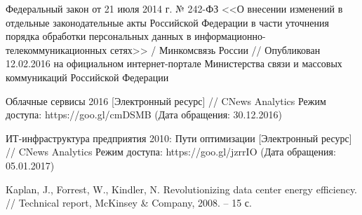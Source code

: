 \begin{thebibliography}{00}
    Федеральный закон от 21 июля 2014 г. № 242-ФЗ <<О внесении изменений в отдельные законодательные акты Российской Федерации в части уточнения порядка обработки персональных данных в информационно-телекоммуникационных сетях>> /
    Минкомсвязь России //
    Опубликован 12.02.2016 на официальном интернет-портале Министерства связи и массовых коммуникаций Российской Федерации

    Облачные сервисы 2016
    [Электронный ресурс] //
    CNews Analytics
    Режим доступа: https://goo.gl/cmDSMB
    (Дата обращения: 30.12.2016)

    ИТ-инфраструктура предприятия 2010: Пути оптимизации
    [Электронный ресурс] //
    CNews Analytics
    Режим доступа: https://goo.gl/jzrrIO
    (Дата обращения: 05.01.2017)

    Kaplan, J., Forrest, W., Kindler, N.
    Revolutionizing data center energy efficiency. //
    Technical report, McKinsey \& Company, 2008. -- 15 с.

\end{thebibliography}
\endgroup

\clearpage
